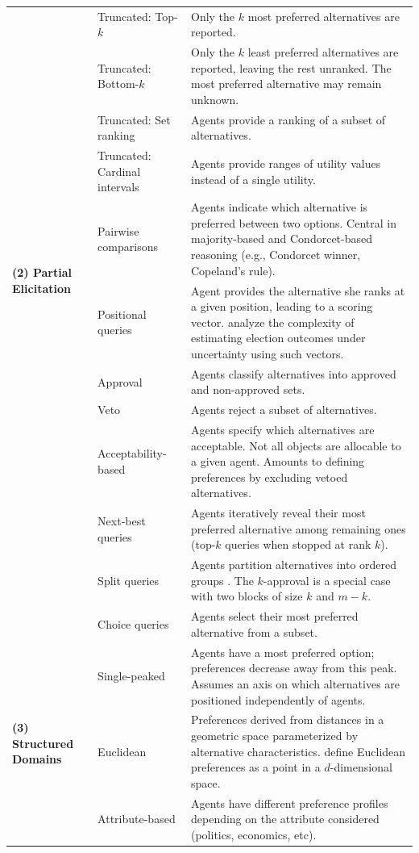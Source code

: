 \documentclass{article}
\begin{document}
\begin{longtable}{p{2.5cm} p{3cm} p{9cm}}
\multirow{10}{2.5cm}{\textbf{(2) Partial Elicitation}}
& Truncated: Top-$k$ & Only the $k$ most preferred 
alternatives are reported. \\
& Truncated: Bottom-$k$ & Only the $k$ least preferred 
alternatives are reported, leaving the rest unranked. 
The most preferred alternative may remain unknown. \\
& Truncated: Set ranking & Agents provide a ranking of 
a subset of alternatives. \\
& Truncated: Cardinal intervals & Agents provide ranges 
of utility values instead of a single utility. \\
& Pairwise comparisons & Agents indicate which alternative 
is preferred between two options. Central in majority-based 
and Condorcet-based reasoning (e.g., Condorcet winner, 
Copeland's rule). \\
& Positional queries & Agent provides the alternative she 
ranks at a given position, leading to a scoring vector. 
\cite{kenig2019approximate} analyze the complexity of 
estimating election outcomes under uncertainty using 
such vectors. \\
& Approval & Agents classify alternatives into approved 
and non-approved sets. \\
& Veto & Agents reject a subset of alternatives. \\
& Acceptability-based & Agents specify which alternatives 
are acceptable. Not all objects are allocable to a given 
agent. Amounts to defining preferences by excluding 
vetoed alternatives. \\
& Next-best queries & Agents iteratively reveal their 
most preferred alternative among remaining ones 
(top-$k$ queries when stopped at rank $k$). \\
& Split queries & Agents partition alternatives into 
ordered groups \citep[Chapter~10]{brandt2016handbook}. 
The $k$-approval is a special case with two blocks 
of size $k$ and $m-k$. \\
& Choice queries & Agents select their most preferred 
alternative from a subset. \\

\midrule

\multirow{3}{2.5cm}{\textbf{(3) Structured Domains}}
& Single-peaked & Agents have a most preferred option; 
preferences decrease away from this peak. Assumes an 
axis on which alternatives are positioned independently 
of agents. \\
& Euclidean & Preferences derived from distances in a 
geometric space parameterized by alternative 
characteristics. \cite{bogomolnaia2007euclidean} define 
Euclidean preferences as a point in a $d$-dimensional 
space. \\
& Attribute-based & Agents have different preference 
profiles depending on the attribute considered 
(politics, economics, etc). \\


\end{longtable}
\end{document}
